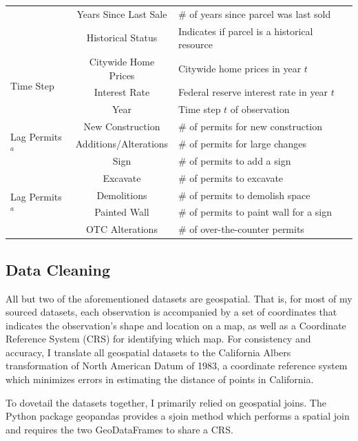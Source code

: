 \documentclass[a4paper,12pt]{article}
\begin{document}
\begin{longtable}{|p{1.6cm}|c|p{7cm}|}
& Years Since Last Sale & \# of years since parcel was last sold \\ 
& Historical Status & Indicates if parcel is a historical resource\\
\hline
\multirow{3}{2cm}{Time Step}
& Citywide Home Prices & Citywide home prices in year $t$ \\
& Interest Rate & Federal reserve interest rate in year $t$ \\ 
& Year & Time step $t$ of observation \\
\hline
\multirow{3}{2cm}{Lag Permits$^a$} & New Construction & \# of permits for new construction \\
& Additions/Alterations & \# of permits for large changes\\
& Sign & \# of permits to add a sign \\
\multirow{4}{2cm}{Lag Permits$^a$} & Excavate & \# of permits to excavate \\
& Demolitions & \# of permits to demolish space \\
& Painted Wall & \# of permits to paint wall for a sign \\
& OTC Alterations & \# of over-the-counter permits
\label{tab:data.sources}
\end{longtable}

\subsection{Data Cleaning}

All but two of the aforementioned datasets are geospatial. That is, for most of my sourced datasets, each observation is accompanied by a set of coordinates that indicates the observation’s shape and location on a map, as well as a Coordinate Reference System (CRS) for identifying which map. For consistency and accuracy, I translate all geospatial datasets to the California Albers transformation of North American Datum of 1983, a coordinate reference system which minimizes errors in estimating the distance of points in California.

To dovetail the datasets together, I primarily relied on geospatial joins. The Python package geopandas provides a sjoin method which performs a spatial join and requires the two GeoDataFrames to share a CRS.  
\end{document}
